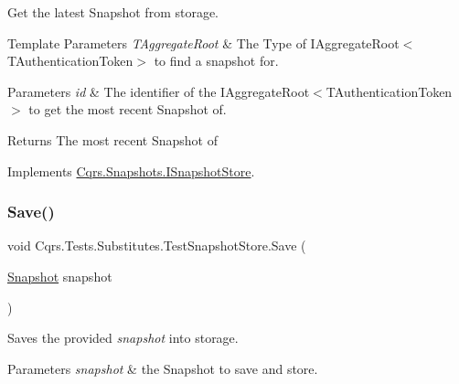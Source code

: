 Get the latest Snapshot from storage. 


\begin{DoxyTemplParams}{Template Parameters}
{\em T\+Aggregate\+Root} & The Type of I\+Aggregate\+Root$<$\+T\+Authentication\+Token$>$ to find a snapshot for.\\
\hline
\end{DoxyTemplParams}

\begin{DoxyParams}{Parameters}
{\em id} & The identifier of the I\+Aggregate\+Root$<$\+T\+Authentication\+Token$>$ to get the most recent Snapshot of.\\
\hline
\end{DoxyParams}
\begin{DoxyReturn}{Returns}
The most recent Snapshot of
\end{DoxyReturn}


Implements \hyperlink{interfaceCqrs_1_1Snapshots_1_1ISnapshotStore_ab7bd163fc9cd5c3bd5911679030be403_ab7bd163fc9cd5c3bd5911679030be403}{Cqrs.\+Snapshots.\+I\+Snapshot\+Store}.

\mbox{\label{classCqrs_1_1Tests_1_1Substitutes_1_1TestSnapshotStore_a223dbc9583120dec1469c1f84b863eae_a223dbc9583120dec1469c1f84b863eae}} 
\subsubsection{\texorpdfstring{Save()}{Save()}}
{\footnotesize\ttfamily void Cqrs.\+Tests.\+Substitutes.\+Test\+Snapshot\+Store.\+Save (\begin{DoxyParamCaption}\item[{\hyperlink{classCqrs_1_1Snapshots_1_1Snapshot}{Snapshot}}]{snapshot }\end{DoxyParamCaption})}



Saves the provided {\itshape snapshot}  into storage. 


\begin{DoxyParams}{Parameters}
{\em snapshot} & the Snapshot to save and store.\\
\hline
\end{DoxyParams}


